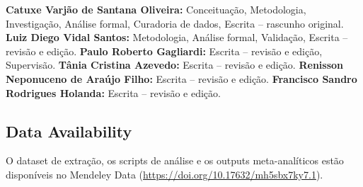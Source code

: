 \documentclass[12pt,a4paper]{article}
\begin{document}
\textbf{Catuxe Varjão de Santana Oliveira:} Conceituação, Metodologia, Investigação, Análise formal, Curadoria de dados, Escrita -- rascunho original. \textbf{Luiz Diego Vidal Santos:} Metodologia, Análise formal, Validação, Escrita -- revisão e edição.
\textbf{Paulo Roberto Gagliardi:} Escrita -- revisão e edição, Supervisão.
\textbf{Tânia Cristina Azevedo:} Escrita -- revisão e edição.
\textbf{Renisson Neponuceno de Araújo Filho:} Escrita -- revisão e edição.
\textbf{Francisco Sandro Rodrigues Holanda:} Escrita -- revisão e edição.

\subsection*{Data Availability}

O dataset de extração, os scripts de análise e os outputs meta-analíticos estão disponíveis no Mendeley Data (\url{https://doi.org/10.17632/mh5sbx7ky7.1}).
\end{document}
